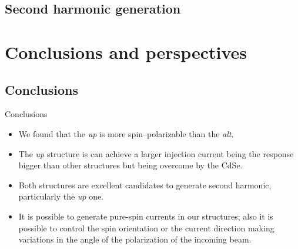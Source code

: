 \documentclass{beamer}
\begin{document}


\subsection{Second harmonic generation}



\section{Conclusions and perspectives} 



\subsection{Conclusions}



\begin{frame}


{\Large Conclusions}
{\small

\begin{itemize}

\item 
We found that the \emph{up} is more spin--polarizable than the \emph{alt}.

\item 
The \emph{up} structure is can achieve a larger injection current being the
response bigger than other structures but being overcome by the CdSe.

\item 
Both structures are excellent candidates to generate second harmonic,
particularly the \emph{up} one.

\item 
It is possible to generate pure-spin currents in our structures; also it is
possible to control the spin orientation or the current direction making
variations in the angle of the polarization of the incoming beam.

\end{itemize}
}

\end{frame}
\end{document}
